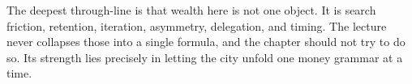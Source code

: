 The deepest through-line is that wealth here is not one object. It is search friction, retention, iteration, asymmetry, delegation, and timing. The lecture never collapses those into a single formula, and the chapter should not try to do so. Its strength lies precisely in letting the city unfold one money grammar at a time.